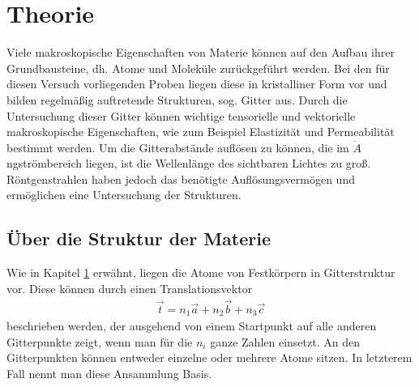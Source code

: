 

\section{Theorie}\label{sec:theorie}
Viele makroskopische Eigenschaften von Materie können auf den Aufbau ihrer Grundbausteine, dh. Atome und Moleküle zurückgeführt werden. Bei den für diesen Versuch vorliegenden Proben liegen diese in kristalliner Form vor und bilden regelmäßig auftretende Strukturen, sog. Gitter aus. Durch die Untersuchung dieser Gitter können wichtige tensorielle und vektorielle makroskopische Eigenschaften, wie zum Beispiel Elastizität und Permeabilität bestimmt werden. Um die Gitterabstände auflösen zu können, die im $\mathring{A}$ngströmbereich liegen, ist die Wellenlänge des sichtbaren Lichtes zu groß. Röntgenstrahlen haben jedoch das benötigte Auflösungsvermögen und ermöglichen eine Untersuchung der Strukturen.

\subsection{Über die Struktur der Materie}
Wie in Kapitel \ref{sec:theorie} erwähnt, liegen die Atome von Festkörpern in Gitterstruktur vor. Diese können durch einen Translationsvektor
\begin{align}
	\vec{t} = n_1\vec{a} +n_2\vec{b} + n_3\vec{c}
\end{align}
beschrieben werden, der ausgehend von einem Startpunkt auf alle anderen Gitterpunkte zeigt, wenn man für die $n_i$ ganze Zahlen einsetzt. An den Gitterpunkten können entweder einzelne oder mehrere Atome sitzen. In letzterem Fall nennt man diese Ansammlung Basis. 

